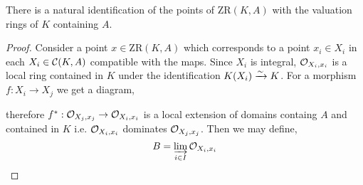 \documentclass[12pt]{article}
\begin{document}
\begin{theorem}
There is a natural identification of the points of $\mathrm{ZR}(K, A)$ with the valuation rings of $K$ containing $A$.
\end{theorem}

\begin{proof}
Consider a point $x \in \mathrm{ZR}(K, A)$ which corresponds to a point $x_i \in X_i$ in each $X_i \in \mathcal{C}(K, A)$ compatible with the maps. Since $X_i$ is integral, $\mathcal{O}_{X_i, x_i}$ is a local ring contained in $K$ under the identification $K(X_i) \xrightarrow{\sim} K$. For a morphism $f : X_i \to X_j$ we get a diagram,
\begin{center}
\end{center}
therefore $f^* : \mathcal{O}_{X_j, x_j} \to \mathcal{O}_{X_i, x_i}$ is a local extension of domains containg $A$ and contained in $K$ i.e. $\mathcal{O}_{X_i, x_i}$ dominates $\mathcal{O}_{X_j, x_j}$. Then we may define,
\[ B = \varinjlim_{i \in I} \mathcal{O}_{X_i, x_i} \] 
\end{proof}
\end{document}
